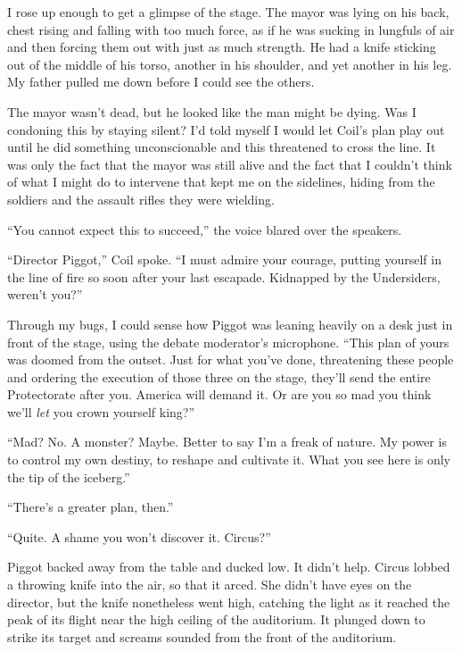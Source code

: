 I rose up enough to get a glimpse of the stage.  The mayor was lying on his back, chest rising and falling with too much force, as if he was sucking in lungfuls of air and then forcing them out with just as much strength.  He had a knife sticking out of the middle of his torso, another in his shoulder, and yet another in his leg.  My father pulled me down before I could see the others.



The mayor wasn't dead, but he looked like the man might be dying.  Was I condoning this by staying silent?  I'd told myself I would let Coil's plan play out until he did something unconscionable and this threatened to cross the line.  It was only the fact that the mayor was still alive and the fact that I couldn't think of what I might do to intervene that kept me on the sidelines, hiding from the soldiers and the assault rifles they were wielding.



``You cannot expect this to succeed,'' the voice blared over the speakers.



``Director Piggot,'' Coil spoke.  ``I must admire your courage, putting yourself in the line of fire so soon after your last escapade.  Kidnapped by the Undersiders, weren't you?''



Through my bugs, I could sense how Piggot was leaning heavily on a desk just in front of the stage, using the debate moderator's microphone.  ``This plan of yours was doomed from the outset.  Just for what you've done, threatening these people and ordering the execution of those three on the stage, they'll send the entire Protectorate after you.  America will demand it.  Or are you so mad you think we'll \emph{let} you crown yourself king?''



``Mad?  No.  A monster?  Maybe.  Better to say I'm a freak of nature.  My power is to control my own destiny, to reshape and cultivate it.  What you see here is only the tip of the iceberg.''



``There's a greater plan, then.''



``Quite.  A shame you won't discover it.  Circus?''



Piggot backed away from the table and ducked low.  It didn't help.  Circus lobbed a throwing knife into the air, so that it arced.  She didn't have eyes on the director, but the knife nonetheless went high, catching the light as it reached the peak of its flight near the high ceiling of the auditorium.   It plunged down to strike its target and screams sounded from the front of the auditorium.



